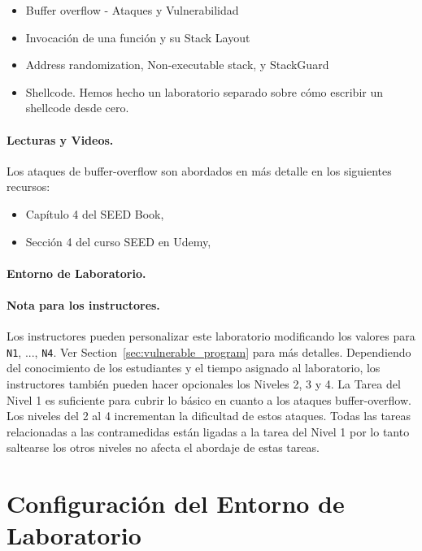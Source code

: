 \begin{itemize}[noitemsep]
\item Buffer overflow - Ataques y Vulnerabilidad
\item Invocación de una función y su Stack Layout
\item Address randomization, Non-executable stack, y  StackGuard
\item Shellcode. Hemos hecho un laboratorio separado sobre cómo escribir un shellcode desde cero.
\end{itemize}



\paragraph{Lecturas y Videos.}
Los ataques de buffer-overflow son abordados en más detalle en los siguientes recursos:

\begin{itemize}
\item Capítulo 4 del SEED Book, \seedbook
\item Sección 4 del curso SEED en Udemy, \seedcsvideo
\end{itemize}


\paragraph{Entorno de Laboratorio.} \seedenvironmentC


\paragraph{Nota para los instructores.}
Los instructores pueden personalizar este laboratorio modificando los valores para \texttt{N1}, ..., \texttt{N4}. Ver Section~\ref{sec:vulnerable_program} para más detalles.
Dependiendo del conocimiento de los estudiantes y el tiempo asignado al laboratorio, los instructores también pueden hacer opcionales los Niveles 2, 3 y 4.
La Tarea del Nivel 1 es suficiente para cubrir lo básico en cuanto a los ataques buffer-overflow. Los niveles del 2 al 4 incrementan la dificultad de estos ataques.
Todas las tareas relacionadas a las contramedidas están ligadas a la tarea del Nivel 1 por lo tanto saltearse los otros niveles no afecta el abordaje de estas tareas.


\section{Configuración del Entorno de Laboratorio} 

